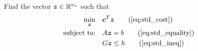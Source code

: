 \documentclass[10pt]{article}
\begin{document}
\begin{problem}
Find the vector $\bm{z}\in{\mathbb{R}}^{n_z}$ such that
\begin{subequations}\label{eq:prob2}
\begin{align}
\min_{\bm{z}} &\quad \bm{c}^T \bm{z} \tag{\ref{eq:std_cost}}\\
\text{subject to:} &\quad A \bm{z} = b \tag{\ref{eq:std_equality}} \\
&\quad G \bm{z} \leq h \tag{\ref{eq:std_ineq}} \\ 
\end{align}
\end{subequations}
\end{problem}
\end{document}
